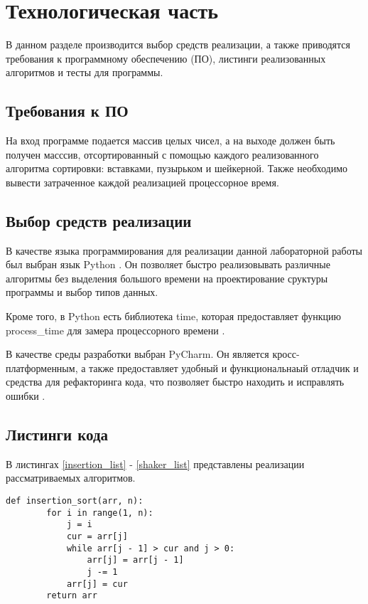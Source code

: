 \chapter{Технологическая часть}

В данном разделе производится выбор средств реализации, а также приводятся требования к программному обеспечению (ПО), листинги реализованных алгоритмов и тесты для программы.

\section{Требования к ПО}

На вход программе подается массив целых чисел, а на выходе должен быть получен масссив, отсортированный с помощью каждого реализованного алгоритма сортировки: вставками, пузырьком и шейкерной. Также необходимо вывести затраченное каждой реализацией процессорное время.

\section{Выбор средств реализации}

В качестве языка программирования для реализации данной лабораторной работы был выбран язык Python  \cite{PythonBook}. Он позволяет быстро реализовывать различные алгоритмы без выделения большого времени на проектирование сруктуры программы и выбор типов данных. 

Кроме того, в Python есть библиотека time, которая предоставляет функцию process\_time для замера процессорного времени \cite{process_time_text}.

В качестве среды разработки выбран PyCharm. Он является кросс-платформенным, а также предоставляет удобный и функциональнаый отладчик и средства для рефакторинга кода, что позволяет быстро находить и исправлять ошибки \cite{pycharm}.

\section{Листинги кода}

В листингах \ref{insertion_list} - \ref{shaker_list} представлены реализации рассматриваемых алгоритмов.

\begin{lstlisting}[caption=Реализация алгоритма сортировки вставками,
	label={insertion_list}]
	def insertion_sort(arr, n):
		for i in range(1, n):
			j = i
			cur = arr[j]
			while arr[j - 1] > cur and j > 0:
				arr[j] = arr[j - 1]
				j -= 1
			arr[j] = cur
		return arr
\end{lstlisting}


